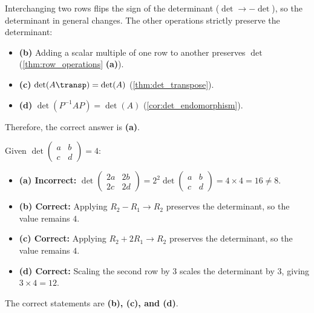 \begin{exercisesolution*}
\label{sol:invariance_under_matrix_operations_sc}
Interchanging two rows flips the sign of the determinant ($\det \to -\det$), so the determinant in general changes.
The other operations strictly preserve the determinant:
\begin{itemize}
    \item \textbf{(b)} Adding a scalar multiple of one row to another preserves $\det$ (\cref{thm:row_operations} \textbf{(a)}).
    \item \textbf{(c)} $\det(A\transp) = \det(A)$ (\cref{thm:det_transpose}).
    \item \textbf{(d)} $\det(P^{-1}AP) = \det(A)$ (\cref{cor:det_endomorphism}).
\end{itemize}
Therefore, the correct answer is \textbf{(a)}.
\end{exercisesolution*}

\begin{exercisesolution*}
\label{sol:row_transformations_2x2_mc}
Given $\det \left(\begin{smallmatrix} a & b \\ c & d \end{smallmatrix}\right) = 4$:
\begin{itemize}
    \item \textbf{(a) Incorrect:} $\det \left(\begin{smallmatrix} 2a & 2b \\ 2c & 2d \end{smallmatrix}\right) = 2^2 \det \left(\begin{smallmatrix} a & b \\ c & d \end{smallmatrix}\right) = 4 \times 4 = 16 \ne 8$.
    \item \textbf{(b) Correct:} Applying $R_2 - R_1 \to R_2$ preserves the determinant, so the value remains $4$.
    \item \textbf{(c) Correct:} Applying $R_2 + 2R_1 \to R_2$ preserves the determinant, so the value remains $4$.
    \item \textbf{(d) Correct:} Scaling the second row by $3$ scales the determinant by $3$, giving $3 \times 4 = 12$.
\end{itemize}
The correct statements are \textbf{(b), (c), and (d)}.
\end{exercisesolution*}


